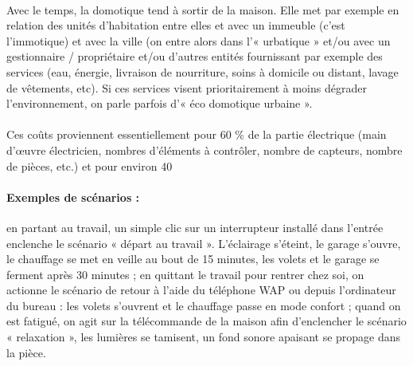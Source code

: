             \paragraph{}
Avec le temps, la domotique tend à sortir de la maison. Elle met par exemple en relation des unités d'habitation entre elles et avec un immeuble (c'est l'immotique) et avec la ville (on entre alors dans l'« urbatique » et/ou avec un gestionnaire / propriétaire et/ou d'autres entités fournissant par exemple des services (eau, énergie, livraison de nourriture, soins à domicile ou distant, lavage de vêtements, etc). Si ces services visent prioritairement à moins dégrader l'environnement, on parle parfois d'« éco domotique urbaine ».
            \paragraph{}
Ces coûts proviennent essentiellement pour 60 \% de la partie électrique (main d’œuvre électricien, nombres d’éléments à contrôler, nombre de capteurs, nombre de pièces, etc.) et pour environ 40 %
            \paragraph{Exemples de scénarios :}
en partant au travail, un simple clic sur un interrupteur installé dans l’entrée enclenche le scénario « départ au travail ».
L’éclairage s’éteint, le garage s’ouvre, le chauffage se met en veille au bout de 15 minutes, les volets et le garage se ferment après 30 minutes ;
en quittant le travail pour rentrer chez soi, on actionne le scénario de retour à l’aide du téléphone WAP ou depuis l’ordinateur du bureau : les volets s’ouvrent et le chauffage passe en mode confort ;
quand on est fatigué, on agit sur la télécommande de la maison afin d’enclencher le scénario « relaxation », les lumières se tamisent, un fond sonore apaisant se propage dans la pièce.


